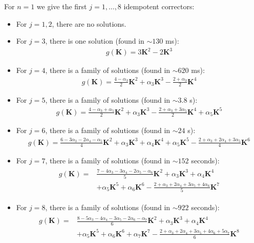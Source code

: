 \documentclass{article}
\theoremstyle{plain}
\theoremstyle{definition}
\theoremstyle{remark}
\newcommand{\vK}{\mathbf{K}}
\begin{document}
For $n=1$ we give the first $j=1,\dots, 8$ idempotent correctors:
\begin{itemize}
    \item For $j=1, 2$, there are no solutions.
    \item {For $j=3$, there is one solution (found in $\sim130$ ms):
          \begin{align}
              g(\vK) = 3 \vK^2 - 2 \vK^3
          \end{align}
          }
    \item {For $j=4$, there is a family of solutions (found in $\sim620$ ms):
          \begin{align}
              g(\vK) = \frac{4 - \alpha_3}{2} \vK^2 + \alpha_3 \vK^3 - \frac{2 + \alpha_3}{2} \vK^4
          \end{align}
          }
    \item {For $j=5$, there is a family of solutions (found in $\sim3.8$ s):
          \begin{align}
              g(\vK) = \frac{4 - \alpha_3 + \alpha_5}{2} \vK^2 + \alpha_3 \vK^3 - \frac{2 + \alpha_3 + 3\alpha_5}{2} \vK^4 + \alpha_5  \vK^5
          \end{align}
          }
    \item {For $j=6$, there is a family of solutions (found in $\sim24$ s):
          \begin{align}
              g(\vK) = \frac{6 - 3\alpha_3 - 2\alpha_4 - \alpha_5}{4} \vK^2 + \alpha_3 \vK^3 + \alpha_4 \vK^4 + \alpha_5  \vK^5 - \frac{2 + \alpha_3 + 2\alpha_4 + 3 \alpha_5}{4} \vK^6
          \end{align}
          }
    \item {For $j=7$, there is a family of solutions (found in $\sim152$ seconds):
          \begin{align}
              \begin{split}
                  g(\vK) = & \frac{7 - 4\alpha_3 - 3 \alpha_4 - 2\alpha_5 - \alpha_6}{5} \vK^2 + \alpha_3 \vK^3 + \alpha_4 \vK^4     \\
                           & + \alpha_5  \vK^5 + \alpha_6 \vK^6 - \frac{2 + \alpha_3 + 2\alpha_4 + 3 \alpha_5 + 4 \alpha_6}{5} \vK^7
              \end{split}
          \end{align}
          }
    \item {For $j=8$, there is a family of solutions (found in $\sim922$ seconds):
          \begin{align}
              \begin{split}
                  g(\vK) = & \frac{8 - 5\alpha_3 - 4 \alpha_4 - 3\alpha_5 - 2\alpha_6 - \alpha_7}{6} \vK^2 + \alpha_3 \vK^3 + \alpha_4 \vK^4                      \\
                           & + \alpha_5  \vK^5 + \alpha_6 \vK^6 + \alpha_7 \vK^7 - \frac{2 + \alpha_3 + 2\alpha_4 + 3 \alpha_5 + 4\alpha_6 + 5 \alpha_7}{6} \vK^8
              \end{split}
          \end{align}
          }

\end{itemize}
\end{document}
